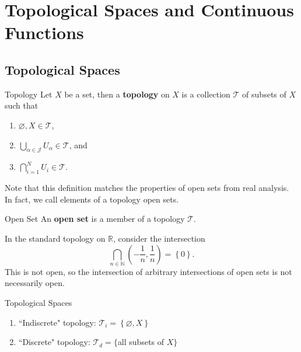 \documentclass[10pt]{report}
\begin{document}
\tableofcontents



\chapter{Topological Spaces and Continuous Functions}


\section{Topological Spaces}


\begin{defn}{Topology}{}
	Let $X$ be a set, then a \textbf{topology} on $X$ is a collection $\mathcal{T}$ of subsets of $X$ such that
	\begin{enumerate}
		\item $\varnothing, X \in \mathcal{T}$,
		\item $\bigcup_{\alpha\in \mathcal{J}}U_\alpha \in \mathcal{T}$, and
		\item $\bigcap_{i=1}^N U_i \in \mathcal{T}$.
	\end{enumerate}
\end{defn}
Note that this definition matches the properties of open sets from real analysis. In fact, we call elements of a topology open sets.
\begin{defn}{Open Set}{}
An \textbf{open set} is a member of a topology $\mathcal{T}$.
\end{defn}

\begin{ex}{}{}
In the standard topology on $\mathbb{R}$, consider the intersection
\[\bigcap_{n\in\mathbb{N}} \left( -\frac{1}{n} , \frac{1}{n}  \right) = \left\{ 0 \right\}  .\]
This is not open, so the intersection of arbitrary intersections of open sets is not necessarily open.
\end{ex}

\begin{ex}{Topological Spaces}{}
\begin{enumerate}
	\item ``Indiscrete" topology: $\mathcal{T}_i = \left\{ \varnothing, X \right\}$ 
	\item ``Discrete" topology: $\mathcal{T}_d =\{$all subsets of $X\}$
\end{enumerate}
\end{ex}
\end{document}
